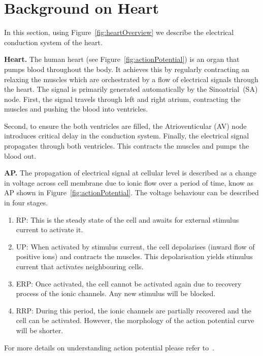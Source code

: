 \section{Background on Heart }
\begin{figure*}[htbp]
	\centering
	
	\caption{Electrical conduction systems of a heart}
	\label{fig:heartOverview}
\end{figure*}

In this section, using Figure~\ref{fig:heartOverview} we 
describe the electrical conduction system of the heart.

\noindent \textbf{Heart.}
The human heart (see Figure~\ref{fig:actionPotential})
 is an organ that pumps blood throughout the body.
It achieves this by regularly contracting an relaxing the muscles
which are orchestrated by a flow of electrical signals through the heart.
The signal is primarily generated automatically by the Sinoatrial~(SA) node.
First, the signal travels through left and right atrium, contracting 
the muscles and pushing the blood into ventricles.
 
Second, to ensure the both ventricles are filled, 
the Atrioventicular (AV) node introduces critical delay 
in the conduction system.   
Finally, the electrical signal propagates through 
both ventricles. This contracts the muscles and pumps the blood out.


	
\noindent \textbf{\acf{AP}.} 
The propagation of electrical signal at cellular level 
is described as a change in  voltage 
across cell membrane due to ionic flow over a period of time, 
know as \acf{AP} shown in Figure~\ref{fig:actionPotential}. 
The voltage behaviour can be described in four stages.
\begin{enumerate}
	\item \acf{RP}: This is the steady state of the cell and awaits for 
					external stimulus current to activate it.
	\item \acf{UP}: When activated by stimulus current, 
					the cell depolarises (inward flow of positive ions) and 
					contracts the muscles. This depolarisation yields 
					stimulus current that activates neighbouring cells.
	\item \acf{ERP}: Once activated, the cell cannot be activated again 
					 due to recovery process of the ionic channels. 
					 Any new stimulus will be blocked. 
	\item \acf{RRP}: During this period, the ionic channels are partially recovered
					 and the cell can be activated. However, the morphology
					 of the action potential curve will be shorter.
	
\end{enumerate} 
 For more details on understanding action potential please refer to~\cite{chen14}.\\

